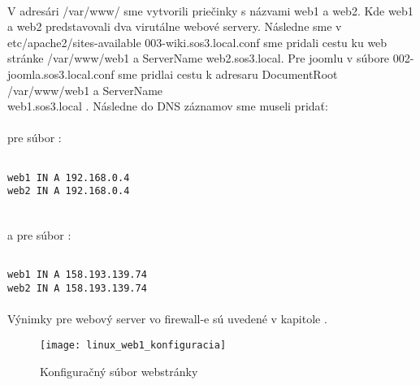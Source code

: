 \paragraph{}
V adresári /var/www/ sme vytvorili priečinky s názvami web1 a web2. Kde web1 a web2 predstavovali dva virutálne webové servery. Následne sme v etc/apache2/sites-available 003-wiki.sos3.local.conf sme pridali cestu ku web stránke /var/www/web1 a ServerName web2.sos3.local. Pre joomlu v súbore 002-joomla.sos3.local.conf sme pridlai cestu k adresaru DocumentRoot /var/www/web1 a ServerName\\ web1.sos3.local . Následne do DNS záznamov sme museli pridať:	

\paragraph{}
pre súbor :

\noindent
{\selectfont

\begin{small}

\begin{verbatim}

web1 IN A 192.168.0.4
web2 IN A 192.168.0.4


\end{verbatim}
\end{small}
}

\paragraph{}
a pre súbor :

\noindent
{\selectfont
\begin{small}
\begin{verbatim}

web1 IN A 158.193.139.74
web2 IN A 158.193.139.74

\end{verbatim}
\end{small}
}

\paragraph{}
Výnimky pre webový server vo firewall-e sú uvedené v kapitole .

\begin{figure}[!htb]
\centering
\texttt{[image: linux\_web1\_konfiguracia]}
\caption{Konfiguračný súbor webstránky}
\label{fig:web1_config_file}
\end{figure}

